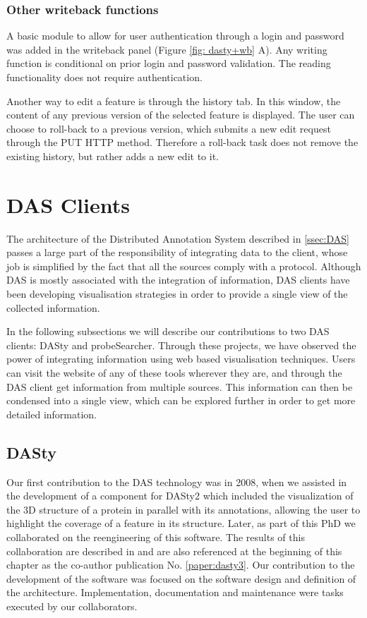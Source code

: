 \subsubsection{Other writeback functions}
A basic module to allow for user authentication through a login and password was added in the writeback panel (Figure \ref{fig: dasty+wb} A). Any writing function is conditional on prior login and password validation. The reading functionality does not require authentication.

Another way to edit a feature is through the history tab. In this window, the content of any previous version of the selected feature is displayed. The user can choose to roll-back to a previous version, which submits a new edit request through the PUT HTTP method. Therefore a roll-back task does not remove the existing history, but rather adds a new edit to it.



	
\section{DAS Clients} \label{section:dasvisual}
The architecture of the Distributed Annotation System described in \ref{ssec:DAS} passes a large part of the responsibility of integrating data to the client, whose job is simplified by the fact that all the sources comply with a protocol. Although DAS is mostly associated with the integration of information, DAS clients have been developing visualisation strategies in order to provide a single view of the collected information.

In the following subsections we will describe our contributions to two DAS clients: DASty and probeSearcher. Through these projects, we have observed the power of integrating information using web based visualisation techniques. Users can visit the website of any of these tools wherever they are, and through the DAS client get information from multiple sources. This information can then be condensed into a single view, which can be explored further in order to get more detailed information.

\subsection{DASty} \label{section:dasty}
Our first contribution to the DAS technology was in 2008, when we assisted in the development of a component for DASty2 which included the visualization of the 3D structure of a protein in parallel with its annotations, allowing the user to highlight the coverage of a feature in its structure. Later, as part of this PhD we collaborated on the reengineering of this software. The results of this collaboration are described in \cite{VIL2011} and are also referenced at the beginning of this chapter as the co-author publication No. \ref{paper:dasty3}. Our contribution to the development of the software was focused on the software design and definition of the architecture. Implementation, documentation and maintenance were tasks executed by our collaborators. 

